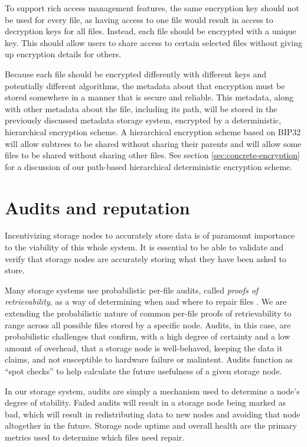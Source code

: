\documentclass[8pt,fleqn,openany]{book}
\begin{document}
To support rich access management features, the same encryption key should not
be used for every file, as having access to one file would result in access
to decryption keys for all files. Instead, each file should be encrypted with
a unique key. This should allow users to share access to certain selected files
without giving up encryption details for others.

Because each file should be encrypted differently with different keys and
potentially different algorithms, the metadata about that encryption must
be stored somewhere in a manner that is secure and reliable. This metadata,
along with other metadata about the file, including its path, will
be stored in the previously discussed metadata storage system, encrypted
by a deterministic, hierarchical encryption scheme.
A hierarchical encryption scheme based on
BIP32 \cite{bip32} will allow subtrees to be shared without sharing their
parents and will allow some files to be shared without sharing other files.
See section \ref{sec:concrete-encryption} for a discussion of our path-based
hierarchical deterministic encryption scheme.

\section{Audits and reputation}\label{sec:framework-audits}

Incentivizing storage nodes to accurately store data is of paramount importance
to
the viability of this whole system. It is essential to be able to
validate and verify that storage nodes are accurately storing what they have
been
asked to store.

Many storage systems use probabilistic per-file audits, called
{\em proofs of retrievability}, as a way of determining
when and where to repair files \cite{juels, shacham}.
We are extending the probabilistic nature of common per-file
proofs of retrievability to range across all possible files stored by a specific
node.
Audits, in this case, are probabilistic challenges that confirm, with a high
degree of certainty and a low amount of overhead, that a storage node is
well-behaved, keeping the data it claims, and not susceptible to hardware
failure or malintent. Audits function as ``spot checks'' \cite{juels2} to help
calculate the future usefulness of a given storage node.

In our storage system,
audits are simply a mechanism used to determine a node's degree of stability.
Failed audits will result in a storage node being marked as bad, which
will result in redistributing data to new nodes and avoiding that node altogether
in the future. Storage node uptime and overall health are the primary metrics
used to determine which files need repair.
\end{document}
